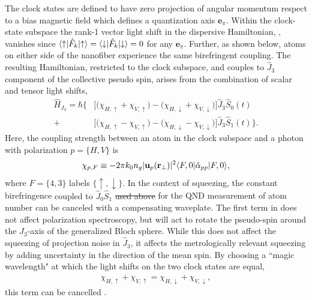 \documentclass[preprint,aps,pra,onecolumn]{revtex4-1} %
\newcommand{\jz}{\hat{J}_3}
\newcommand{\comment}[1]{{\color{Maroon} #1}}
\begin{document}
The clock states are defined to have zero projection of angular momentum respect to a bias magnetic field which defines a quantization axis $\mathbf{e}_\pi$.  Within the clock-state subspace the rank-1 vector light shift in the dispersive Hamiltonian, , vanishes since $\langle{\uparrow}\rvert\hat{F}_k \lvert{\uparrow}\rangle =\langle{\downarrow}\rvert\hat{F}_k \lvert{\downarrow}\rangle = 0$ for any $\mathbf{e}_\pi$. Further, as shown below, atoms on either side of the nanofiber experience the same birefringent coupling. The resulting Hamiltonian, restricted to the clock subspace, and couples to $\hat{J}_3$ component of the collective pseudo spin, arises from the combination of scalar and tensor light shifts,
	\begin{align} \label{Eq::ClockHamiltonian}
		\hat{H}_{J_3} = \hbar \Big\{ & \big[ \big( \chi_{H,\uparrow} +\chi_{V,\uparrow} \big) - \big( \chi_{H,\downarrow} + \chi_{V,\downarrow}\big) \big] \jz \hat{S}_0(t) \\
		+ & \big[  \big( \chi_{H, \uparrow} - \chi_{V,\uparrow} \big) - \big(\chi_{H,\downarrow} - \chi_{V,\downarrow} \big) \big]  \jz \hat{S}_1(t) \Big\}. \nonumber
	\end{align}
Here, the coupling strength between an atom in the clock subspace and a photon with polarization $p = \{H,V\}$ is
	\begin{equation} \label{Eq::ClockCouplingStrength}
		\chi_{p,F} \equiv - 2\pi k_0 n_g  | \mathbf{u}_p(\mathbf{r}_\perp)|^2 \langle{F,0}\rvert\hat{\alpha}_{pp}  \lvert{F,0}\rangle,
	\end{equation}
where $F = \{4,3\}$ labels $\{\uparrow,\downarrow\}$. In the context of squeezing, the constant birefringence \comment{coupled to $ \hat{J}_0\hat{S}_1 $ \sout{used above}} for the QND measurement of atom number can be canceled with a compensating waveplate. The first term in  does not affect polarization spectroscopy, but will act to rotate the pseudo-spin around the $J_3$-axis of the generalized Bloch sphere.  While this does not affect the squeezing of projection noise in $\hat{J}_3$, it affects the metrologically relevant squeezing by adding uncertainty in the direction of the mean spin.  By choosing a ``magic wavelength" at which the light shifts on the two clock states are equal, 
	\begin{align} \label{Eq::MagicWavelengthCondition}
		\chi_{H,\uparrow} +\chi_{V,\uparrow}  = \chi_{H,\downarrow} + \chi_{V,\downarrow},
	\end{align}
this term can be cancelled \cite{chaudhury_continuous_2006}. 
\end{document}
